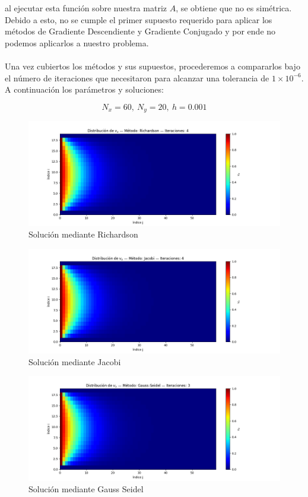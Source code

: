 \documentclass{article}
\begin{document}
  al ejecutar esta función sobre nuestra matriz $A$, se obtiene que no es simétrica. Debido a esto, no se cumple el primer supuesto requerido para aplicar los métodos de Gradiente Descendiente y Gradiente Conjugado y por ende no podemos aplicarlos a nuestro problema.

  \paragraph{}
  Una vez cubiertos los métodos y sus supuestos, procederemos a compararlos bajo el número de iteraciones que necesitaron para alcanzar una tolerancia de $1\times10^{-6}$. A continuación los parámetros y soluciones:

  \[N_x=60, \ N_y=20, \ h=0.001\]

  \begin{figure}[H]
      \centering
      \includegraphics[width=1.2\textwidth]{Richardson.png}
      \caption{Solución mediante Richardson}
  \end{figure}

  \begin{figure}[H]
      \centering
      \includegraphics[width=1.2\textwidth]{Jacobi.png}
      \caption{Solución mediante Jacobi}
  \end{figure}

  \begin{figure}[H]
      \centering
      \includegraphics[width=1.2\textwidth]{GaussSeidel.png}
      \caption{Solución mediante Gauss Seidel}
  \end{figure}
\end{document}
